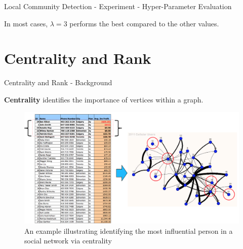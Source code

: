\documentclass[9pt]{beamer}
\newcommand{\themename}{\textbf{\textsc{metropolis}}\xspace}
\begin{document}
\begin{frame}{Local Community Detection - Experiment - Hyper-Parameter Evaluation}
\begin{figure}[h]
\begin{subfigure}[b]{\textwidth}
\centering
\end{subfigure}
\label{hyper}
\end{figure}
In most cases, $\lambda=3$ performs the best compared to the other values.
\end{frame}

\section{Centrality and Rank}

\begin{frame}{Centrality and Rank - Background}





\textbf{Centrality} identifies the importance of vertices within a graph.
\vspace{-0.11in}
\begin{figure}[H]
\centering
\includegraphics[scale = 0.29]{famous_example.png}
\caption{An example illustrating identifying the most influential person in a social network via centrality}
\end{figure}
\end{frame}
\end{document}
